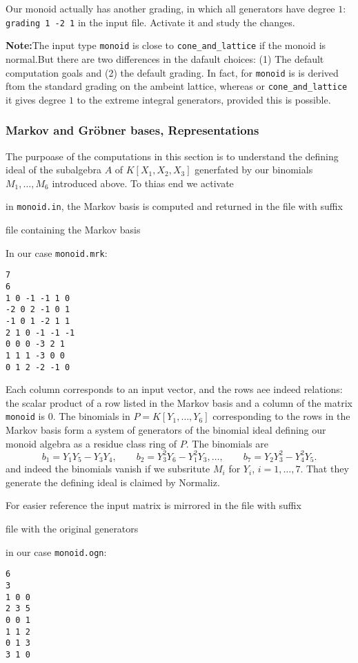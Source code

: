 Our monoid actually has another grading, in which all generators have degree $1$: \verb|grading 1 -2 1| in the input file. Activate it and study the changes.

\textbf{Note:}\enspace The input type \verb|monoid| is close to \verb|cone_and_lattice| if the monoid is normal.But there are two differences in the dafault choices: (1) The default computation goals and (2) the default grading. In fact, for \verb|monoid| is is derived ftom the standard grading on the ambeint lattice, whereas or \verb|cone_and_lattice| it gives degree $1$ to the extreme integral generators, provided this is possible.

\subsubsection{Markov and Gröbner bases, Representations}\label{markov}
The purpoase of the computations in this section is to understand the defining ideal of the subalgebra $A$ of $K[X_1,X_2,X_3]$ generfated by our binomials $M_1,\dots,M_6$ introduced above. To thias end we activate
\begin{itemize}
	\itemtt[MarkovBasis]
\end{itemize}
in \verb|monoid.in|, the Markov basis is computed and returned in the file with suffix 
\begin{itemize}
	\itemtt[mrk] file containing the Markov basis	
\end{itemize}
In our case \verb|monoid.mrk|:
\begin{Verbatim}
7
6
1 0 -1 -1 1 0 
-2 0 2 -1 0 1 
-1 0 1 -2 1 1 
2 1 0 -1 -1 -1 
0 0 0 -3 2 1 
1 1 1 -3 0 0 
0 1 2 -2 -1 0
\end{Verbatim}
Each column corresponds to an input vector, and the rows aee indeed relations: the scalar product of a row listed in the Markov basis and a column of the matrix \verb|monoid| is $0$. The binomials in $P=K[Y_1,\dots,Y_6]$ corresponding to the rows in the Markov basis form a system of generators of the binomial ideal defining our monoid algebra as a residue class ring of $P$. The binomials are
$$
b_1 = Y_1Y_5 - Y_3Y_4, \qquad b_2 = Y_3^2Y_6 - Y_1^2Y_3,\dots,\qquad b_7 = Y_2Y_3^2 - Y_4^2Y_5.
$$
and indeed the binomials vanish if we subsritute $M_i$ for $Y_i$, $i=1,\dots,7$. That they generate the defining ideal is claimed by Normaliz.

For easier reference the input matrix is mirrored in the file with suffix 
\begin{itemize}
	\itemtt[ogn] file with the original generators
\end{itemize}
in our case \verb|monoid.ogn|:
\begin{Verbatim}
6
3
1 0 0 
2 3 5 
0 0 1 
1 1 2 
0 1 3 
3 1 0
\end{Verbatim}

